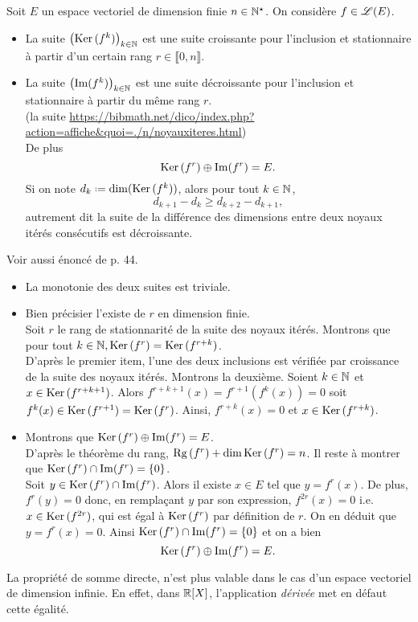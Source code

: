 \begin{prop}
    Soit $E$ un espace vectoriel de dimension finie $n \in \mathbb{N}^\star$. On considère $f \in \mathscr{L}(E)$.
    \begin{itemize}
        \item La suite $\left( \mathrm{Ker}\,(f^k) \right)_{k \in \mathbb{N}}$ est une suite croissante pour l'inclusion et stationnaire à partir d'un certain rang $r \in \llbracket 0, n \rrbracket$.
        \item La suite $\left( \Im(f^k) \right)_{k \in \mathbb{N}}$ est une suite décroissante pour l'inclusion et stationnaire à partir du même rang $r$. \\
        (la suite \url{https://bibmath.net/dico/index.php?action=affiche&quoi=./n/noyauxiteres.html}) \\De plus
        $$\mathrm{Ker}\,(f^r) \oplus \Im(f^r) = E.$$
        Si on note $d_k \defeq \dim(\Ker(f^k))$, alors pour tout $k \in \mathbb{N}$, 
        $$d_{k+1} - d_k \geqslant d_{k+2} - d_{k+1},$$
        autrement dit la suite de la différence des dimensions entre deux noyaux itérés consécutifs est décroissante. 
    \end{itemize}
\end{prop} 

Voir aussi énoncé de \cite{exos_oraux} p. 44.

\begin{preuve}
    \begin{itemize}
        \item La monotonie des deux suites est triviale. 
        \item Bien précisier l'existe de $r$ en dimension finie. \\
        Soit $r$ le rang de stationnarité de la suite des noyaux itérés. Montrons que pour tout $k \in \mathbb{N}, \mathrm{Ker}\,(f^r) = \mathrm{Ker}\,(f^{r+k})$. \\
        D'après le premier item, l'une des deux inclusions est vérifiée par croissance de la suite des noyaux itérés. Montrons la deuxième. Soient $k \in \mathbb{N}$ et $x \in \mathrm{Ker}\,(f^{r+k+1})$. Alors $f^{r+k+1}(x) = f^{r+1}(f^k(x)) = 0$ soit $f^k(x) \in \mathrm{Ker}\,(f^{r+1}) = \mathrm{Ker}\,(f^r)$. Ainsi, $f^{r+k}(x) = 0$ et $x \in \mathrm{Ker}\,(f^{r+k})$.
        \item Montrons que $\mathrm{Ker}\,(f^r) \oplus \Im(f^r) = E$. \\
        D'après le théorème du rang, $\mathrm{Rg}\,(f^r) + \dim \mathrm{Ker}\,(f^r) = n$. Il reste à montrer que $\mathrm{Ker}\,(f^r) \cap \Im(f^r) = \{ 0 \}$. \\
        Soit $y \in \mathrm{Ker}\,(f^r) \cap \Im(f^r)$. Alors il existe $x \in E$ tel que $y = f^r(x)$. De plus, $f^r(y) = 0$ donc, en remplaçant $y$ par son expression, $f^{2r}(x) = 0$ i.e. $x \in \mathrm{Ker}\,(f^{2r})$, qui est égal à $\mathrm{Ker}\,(f^r)$ par définition de $r$. On en déduit que $y = f^r(x) = 0$. Ainsi $\mathrm{Ker}\,(f^r) \cap \Im(f^r) = \{ 0 \}$ et on a bien
        $$\mathrm{Ker}\,(f^r) \oplus \Im(f^r) = E.$$
    \end{itemize}
\end{preuve}

\begin{remarque}
    La propriété de somme directe, n'est plus valable dans le cas d'un espace vectoriel de dimension infinie. En effet, dans $\mathbb{R}[X]$, l'application \emph{dérivée} met en défaut cette égalité. 
\end{remarque}





